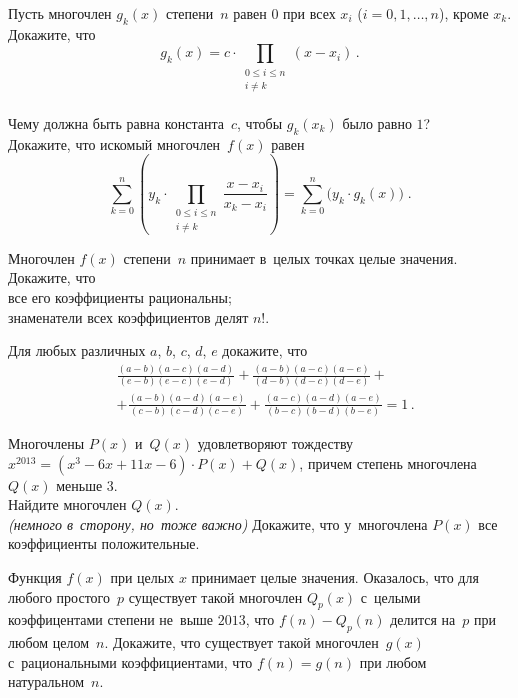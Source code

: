 \begin{problems}

\item
\subproblem
Пусть многочлен $g_{k}(x)$ степени~$n$ равен $0$ при всех $x_{i}$
($i = 0, 1, \ldots, n$), кроме $x_{k}$.
Докажите, что
\[
    g_{k}(x)
=
    c \cdot \prod_{\substack{0 \leq i \leq n \\ i \neq k}}
        (x - x_{i})
\, . \]
\\
\subproblem
Чему должна быть равна константа~$c$, чтобы $g_{k}(x_{k})$ было равно $1$?
\\
\subproblem
{}
Докажите, что искомый многочлен~$f(x)$ равен
\[
    \sum_{k=0}^{n}
        \left(
            y_{k} \cdot
            \prod_{\substack{0 \leq i \leq n \\ i \neq k}}
                \dfrac{x - x_{i}}{x_{k} - x_{i}}
        \right)
=
    \sum_{k=0}^{n}
        \bigl( y_{k} \cdot g_{k}(x) \bigr)
\; . \]

\item
Многочлен $f(x)$ степени~$n$ принимает в~целых точках целые значения.
Докажите, что
\\
\subproblem
все его коэффициенты рациональны;
\\
\subproblem
знаменатели всех коэффициентов делят $n!$.

\item
Для любых различных $a$, $b$, $c$, $d$, $e$ докажите, что
\begin{align*} &
    \frac{(a - b) (a - c) (a - d)}{(e - b) (e - c) (e - d)} +
    \frac{(a - b) (a - c) (a - e)}{(d - b) (d - c) (d - e)}
    + \\ & +
    \frac{(a - b) (a - d) (a - e)}{(c - b) (c - d) (c - e)} +
    \frac{(a - c) (a - d) (a - e)}{(b - c) (b - d) (b - e)}
=
    1
\, . \end{align*}

\item
Многочлены $P(x)$ и~$Q(x)$ удовлетворяют тождеству
$x^{2013} = (x^{3} - 6 x + 11 x - 6) \cdot P(x) + Q(x)$, причем степень
многочлена $Q(x)$ меньше $3$.
\\
\subproblem
Найдите многочлен $Q(x)$.
\\
\subproblem
\emph{(немного в~сторону, но~тоже важно)}
Докажите, что у~многочлена $P(x)$  все коэффициенты положительные.

\item
Функция $f(x)$ при целых $x$ принимает целые значения.
Оказалось, что для любого простого~$p$ существует такой многочлен $Q_{p}(x)$
с~целыми коэффицентами степени не~выше $2013$, что $f(n) - Q_{p}(n)$ делится
на~$p$ при любом целом~$n$.
Докажите, что существует такой многочлен~$g(x)$ с~рациональными коэффициентами,
что $f(n) = g(n)$ при любом натуральном~$n$.

\end{problems}

